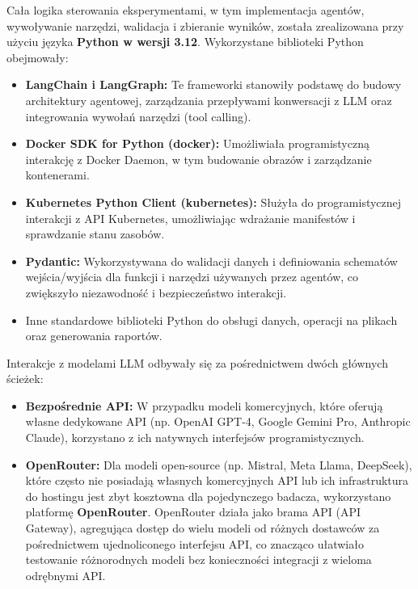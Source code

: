 Cała logika sterowania eksperymentami, w tym implementacja agentów, wywoływanie narzędzi, walidacja i zbieranie wyników, została zrealizowana przy użyciu języka \textbf{Python w wersji 3.12}. Wykorzystane biblioteki Python obejmowały:
\begin{itemize}
	\item \textbf{LangChain i LangGraph:} Te frameworki stanowiły podstawę do budowy architektury agentowej, zarządzania przepływami konwersacji z LLM oraz integrowania wywołań narzędzi (tool calling).
	\item \textbf{Docker SDK for Python (docker):} Umożliwiała programistyczną interakcję z Docker Daemon, w tym budowanie obrazów i zarządzanie kontenerami.
	\item \textbf{Kubernetes Python Client (kubernetes):} Służyła do programistycznej interakcji z API Kubernetes, umożliwiając wdrażanie manifestów i sprawdzanie stanu zasobów.
	\item \textbf{Pydantic:} Wykorzystywana do walidacji danych i definiowania schematów wejścia/wyjścia dla funkcji i narzędzi używanych przez agentów, co zwiększyło niezawodność i bezpieczeństwo interakcji.
	\item Inne standardowe biblioteki Python do obsługi danych, operacji na plikach oraz generowania raportów.
\end{itemize}

Interakcje z modelami LLM odbywały się za pośrednictwem dwóch głównych ścieżek:
\begin{itemize}
	\item \textbf{Bezpośrednie API:} W przypadku modeli komercyjnych, które oferują własne dedykowane API (np. OpenAI GPT-4, Google Gemini Pro, Anthropic Claude), korzystano z ich natywnych interfejsów programistycznych.
	\item \textbf{OpenRouter:} Dla modeli open-source (np. Mistral, Meta Llama, DeepSeek), które często nie posiadają własnych komercyjnych API lub ich infrastruktura do hostingu jest zbyt kosztowna dla pojedynczego badacza, wykorzystano platformę \textbf{OpenRouter}. OpenRouter działa jako brama API (API Gateway), agregująca dostęp do wielu modeli od różnych dostawców za pośrednictwem ujednoliconego interfejsu API, co znacząco ułatwiało testowanie różnorodnych modeli bez konieczności integracji z wieloma odrębnymi API.
\end{itemize}

